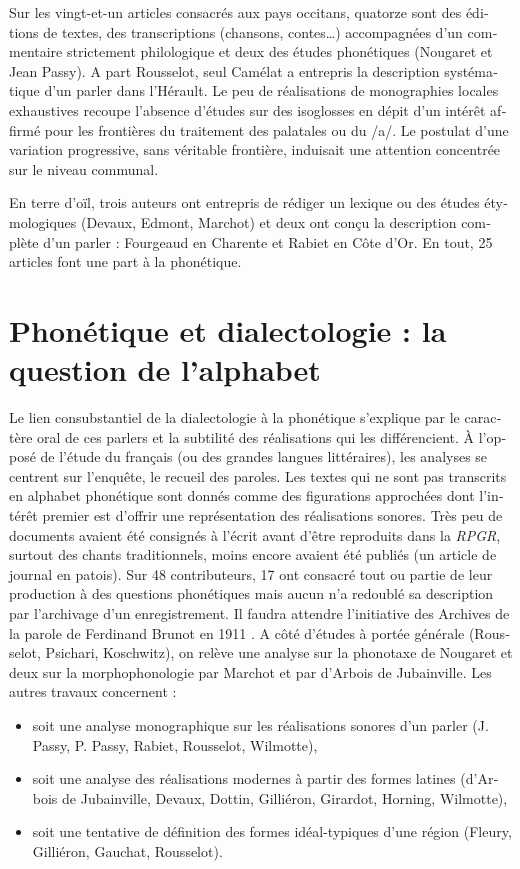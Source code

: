 \documentclass[french,output=paper,colorlinks,citecolor=brown]{../langscibook}
\begin{document}
\begin{otherlanguage}{french}
Sur les vingt-et-un articles consacrés aux pays occitans, quatorze sont des éditions de textes, des transcriptions (chansons, contes…) accompagnées d’un commentaire strictement philologique et deux des études phonétiques (Nougaret et Jean Passy). A part Rousselot, seul Camélat a entrepris la description systématique d’un parler dans l’Hérault. Le peu de réalisations de monographies locales exhaustives recoupe l’absence d’études sur des isoglosses en dépit d’un intérêt affirmé pour les frontières du traitement des palatales ou du /a/. Le postulat d’une variation progressive, sans véritable frontière, induisait une attention concentrée sur le niveau communal. 

En terre d’oïl, trois auteurs ont entrepris de rédiger un lexique ou des études étymologiques (Devaux, Edmont, Marchot) et deux ont conçu la description complète d’un parler : Fourgeaud en Charente et Rabiet en Côte d’Or. En tout, 25 articles font une part à la phonétique.

\section{Phonétique et dialectologie : la question de l’alphabet}

Le lien consubstantiel de la dialectologie à la phonétique s’explique par le caractère oral de ces parlers et la subtilité des réalisations qui les différencient. À l’opposé de l’étude du français (ou des grandes langues littéraires), les analyses se centrent sur l’enquête, le recueil des paroles. Les textes qui ne sont pas transcrits en alphabet phonétique sont donnés comme des figurations approchées dont l’intérêt premier est d’offrir une représentation des réalisations sonores. Très peu de documents avaient été consignés à l’écrit avant d’être reproduits dans la \textit{RPGR}, surtout des chants traditionnels, moins encore avaient été publiés (un article de journal en patois). Sur 48 contributeurs, 17 ont consacré tout ou partie de leur production à des questions phonétiques mais aucun n’a redoublé sa description par l’archivage d’un enregistrement. Il faudra attendre l’initiative des Archives de la parole de Ferdinand Brunot en 1911 \citep{Cordereix2001}. A côté d’études à portée générale (Rousselot, Psichari, Koschwitz), on relève une analyse sur la phonotaxe de Nougaret et deux sur la morphophonologie par Marchot et par d’Arbois de Jubainville. Les autres travaux concernent :

\begin{itemize}
    \item  soit une analyse monographique sur les réalisations sonores d’un parler (J. Passy, P. Passy, Rabiet, Rousselot, Wilmotte), 
    \item  soit une analyse des réalisations modernes à partir des formes latines (d’Arbois de Jubainville, Devaux, Dottin, Gilliéron, Girardot, Horning, Wilmotte), 
    \item  soit une tentative de définition des formes idéal-typiques d’une région (Fleury, Gilliéron, Gauchat, Rousselot).
\end{itemize}


\end{otherlanguage}
\end{document}
